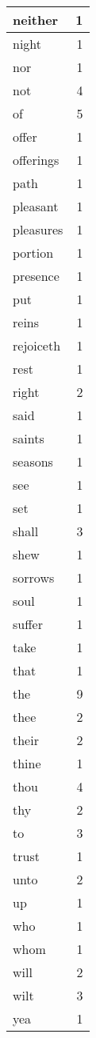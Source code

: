 \begin{center}
\begin{longtable}{l|r}
neither & 1 \\ \hline
night & 1 \\ \hline
nor & 1 \\ \hline
not & 4 \\ \hline
of & 5 \\ \hline
offer & 1 \\ \hline
offerings & 1 \\ \hline
path & 1 \\ \hline
pleasant & 1 \\ \hline
pleasures & 1 \\ \hline
portion & 1 \\ \hline
presence & 1 \\ \hline
put & 1 \\ \hline
reins & 1 \\ \hline
rejoiceth & 1 \\ \hline
rest & 1 \\ \hline
right & 2 \\ \hline
said & 1 \\ \hline
saints & 1 \\ \hline
seasons & 1 \\ \hline
see & 1 \\ \hline
set & 1 \\ \hline
shall & 3 \\ \hline
shew & 1 \\ \hline
sorrows & 1 \\ \hline
soul & 1 \\ \hline
suffer & 1 \\ \hline
take & 1 \\ \hline
that & 1 \\ \hline
the & 9 \\ \hline
thee & 2 \\ \hline
their & 2 \\ \hline
thine & 1 \\ \hline
thou & 4 \\ \hline
thy & 2 \\ \hline
to & 3 \\ \hline
trust & 1 \\ \hline
unto & 2 \\ \hline
up & 1 \\ \hline
who & 1 \\ \hline
whom & 1 \\ \hline
will & 2 \\ \hline
wilt & 3 \\ \hline
yea & 1 \\ \hline
\end{longtable}
\end{center}



